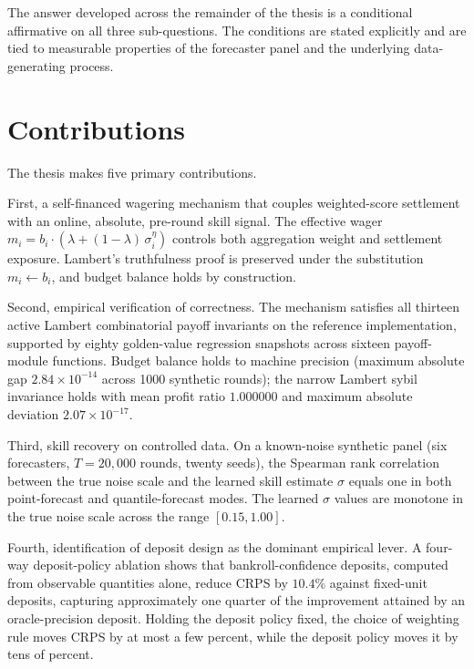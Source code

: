 \documentclass[
  11pt,
  a4paper,
  oneside]{report}
\begin{document}
The answer developed across the remainder of the thesis is a conditional
affirmative on all three sub-questions. The conditions are stated
explicitly and are tied to measurable properties of the forecaster panel
and the underlying data-generating process.

\section{Contributions}\label{contributions}

The thesis makes five primary contributions.

First, a self-financed wagering mechanism that couples weighted-score
settlement with an online, absolute, pre-round skill signal. The
effective wager
\(m_i = b_i \cdot (\lambda + (1-\lambda)\,\sigma_i^{\eta})\) controls
both aggregation weight and settlement exposure. Lambert's truthfulness
proof \citep{lambert2008selffinanced} is preserved under the
substitution \(m_i \leftarrow b_i\), and budget balance holds by
construction.

Second, empirical verification of correctness. The mechanism satisfies
all thirteen active Lambert combinatorial payoff invariants on the
reference implementation, supported by eighty golden-value regression
snapshots across sixteen payoff-module functions. Budget balance holds
to machine precision (maximum absolute gap \(2.84 \times 10^{-14}\)
across 1000 synthetic rounds); the narrow Lambert sybil invariance holds
with mean profit ratio \(1.000000\) and maximum absolute deviation
\(2.07 \times 10^{-17}\).

Third, skill recovery on controlled data. On a known-noise synthetic
panel (six forecasters, \(T = 20{,}000\) rounds, twenty seeds), the
Spearman rank correlation between the true noise scale and the learned
skill estimate \(\sigma\) equals one in both point-forecast and
quantile-forecast modes. The learned \(\sigma\) values are monotone in
the true noise scale across the range \([0.15, 1.00]\).

Fourth, identification of deposit design as the dominant empirical
lever. A four-way deposit-policy ablation shows that bankroll-confidence
deposits, computed from observable quantities alone, reduce CRPS by
\(10.4\%\) against fixed-unit deposits, capturing approximately one
quarter of the improvement attained by an oracle-precision deposit.
Holding the deposit policy fixed, the choice of weighting rule moves
CRPS by at most a few percent, while the deposit policy moves it by tens
of percent.
\end{document}
